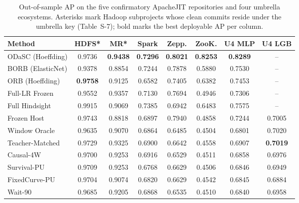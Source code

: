 \documentclass[pdflatex,sn-basic]{sn-jnl}
\theoremstyle{definition}
\theoremstyle{plain}
\begin{document}
\begin{table}[t]
\centering
\caption{Out-of-sample AP on the five confirmatory ApacheJIT repositories and four umbrella ecosystems. Asterisks mark Hadoop subprojects whose clean commits reside under the umbrella key (Table~S-7); bold marks the best deployable AP per column.}
\label{tab:confirmatory}
\fontsize{7.5}{9.0}\selectfont
\setlength{\tabcolsep}{1.5pt}
\begin{tabular*}{\textwidth}{@{\extracolsep\fill}lccccccc@{}}
\toprule
\textbf{Method} & \textbf{HDFS*} & \textbf{MR*} & \textbf{Spark} & \textbf{Zepp.} & \textbf{ZooK.} & \textbf{U4 MLP} & \textbf{U4 LGB} \\
\midrule
ODaSC (Hoeffding) & 0.9736 & \textbf{0.9438} & \textbf{0.7296} & \textbf{0.8021} & \textbf{0.8253} & \textbf{0.8289} & -- \\
BORB (ElasticNet) & 0.9378 & 0.8854 & 0.7244 & 0.7878 & 0.5880 & 0.7530 & -- \\
ORB (Hoeffding) & \textbf{0.9758} & 0.9125 & 0.6582 & 0.7405 & 0.6382 & 0.7453 & -- \\
Full-LR Frozen & 0.9552 & 0.9357 & 0.7130 & 0.7694 & 0.4946 & 0.7306 & -- \\
\midrule
Full Hindsight & 0.9915 & 0.9069 & 0.7385 & 0.6942 & 0.6483 & 0.7575 & -- \\
Frozen Host & 0.9743 & 0.8818 & 0.6897 & 0.7940 & 0.4858 & 0.7244 & 0.7005 \\
Window Oracle & 0.9635 & 0.9070 & 0.6864 & 0.6485 & 0.4504 & 0.6801 & 0.7020 \\
Teacher-Matched & 0.9729 & 0.9325 & 0.6900 & 0.6642 & 0.4558 & 0.6907 & \textbf{0.7019} \\
Causal-4W & 0.9700 & 0.9253 & 0.6916 & 0.6529 & 0.4511 & 0.6858 & 0.6976 \\
Survival-PU & 0.9709 & 0.9253 & 0.6768 & 0.6629 & 0.4506 & 0.6846 & 0.6949 \\
FixedCurve-PU & 0.9704 & 0.9074 & 0.6820 & 0.6629 & 0.4542 & 0.6845 & 0.6884 \\
Wait-90 & 0.9685 & 0.9205 & 0.6868 & 0.6535 & 0.4510 & 0.6840 & 0.6958 \\
\bottomrule
\end{tabular*}
\vspace{2pt}\par{}
\end{table}
\end{document}
